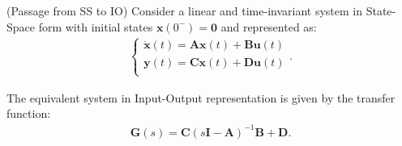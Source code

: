 \documentclass[a4paper,11pt]{book}
\numberwithin{figure}{chapter}
\numberwithin{equation}{chapter}
\numberwithin{table}{chapter}
\newtheorem{theorem}{Theorem}[chapter]
\theoremstyle{definition}
\newcounter{boxed-theorem}
\newenvironment{boxed-theorem}[1]
{\colorlet{shadecolor}{pastelBlue2!10} \begin{shaded} \begin{theorem}{#1}}
{\end{theorem} \end{shaded}}
\newcounter{boxed-definition}
\newcounter{boxed-example}
\begin{document}
\begin{boxed-theorem}{(Passage from SS to IO)} \label{th:SSToIO}
    Consider a linear and time-invariant system in State-Space form with initial states $\bm{x}(0^-) = \bm{0}$ and represented as:
    \begin{align}
    \begin{cases}
        \dot{\bm{x}}(t) = \bm{A} \bm{x}(t) + \bm{B} \bm{u}(t) \\
        \bm{y}(t) = \bm{C} \bm{x}(t) + \bm{D} \bm{u}(t) \\
    \end{cases}     
    .\end{align}
    
\noindent The equivalent system in Input-Output representation is given by the transfer function:
    \begin{align}
    \bm{G}(s) = \bm{C} (s\bm{I} - \bm{A})^{-1} \bm{B} + \bm{D}
    .\end{align}
\end{boxed-theorem}
 
\end{document}
